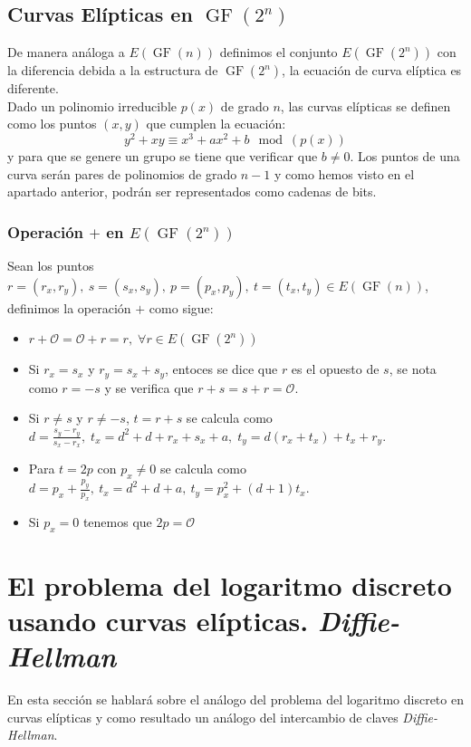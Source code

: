 \begin{aligned*}
\subsection{Curvas Elípticas en $\operatorname{GF}(2^n)$}

De manera análoga a $E(\operatorname{GF}(n))$ definimos el conjunto $E(\operatorname{GF}(2^n))$ con la diferencia debida a la estructura de $\operatorname{GF}(2^n)$, la ecuación de curva elíptica es diferente.\\
Dado un polinomio irreducible $p(x)$ de grado $n$, las curvas elípticas se definen como los puntos $(x,y)$ que cumplen la ecuación:
$$
	y^2+xy \equiv x^3+ax^2+b \mod (p(x))
$$
y para que se genere un grupo se tiene que verificar que $b\neq 0$.
Los puntos de una curva serán pares de polinomios de grado $n-1$ y como hemos visto en el apartado anterior, podrán ser representados como cadenas de bits.\\

\subsubsection{Operación $+$ en $E(\operatorname{GF}(2^n))$}
Sean los puntos $r=(r_x,r_y),\: s=(s_x,s_y),\: p=(p_x,p_y),\: t=(t_x,t_y)\in E(\operatorname{GF}(n))$, definimos la operación $+$  como sigue:
\begin{itemize}
	\item $r+\mathcal{O}=\mathcal{O}+r=r,\; \forall r \in E(\operatorname{GF}(2^n))$
	\item Si $r_x=s_x$ y $r_y=s_x+s_y$, entoces se dice que $r$ es el opuesto de $s$, se nota como $r=-s$ y se verifica que $r+s=s+r=\mathcal{O}$.
	\item Si $r\neq s$ y $r\neq-s$, $t=r+s$ se calcula como $d=\frac{s_y-r_y}{s_x-r_x},\; t_x=d^2+d+r_x+s_x+a,\; t_y=d(r_x+t_x)+t_x+r_y$.
	\item Para $t=2p$ con $p_x\neq 0$ se calcula como $d=p_x+\frac{p_y}{p_x}, \: t_x=d^2+d+a, \: t_y=p_x^2+(d+1)t_x$.
	\item Si $p_x=0$ tenemos que $2p=\mathcal{O}$
\end{itemize}

\section{El problema del logaritmo discreto usando curvas elípticas. \emph{Diffie-Hellman}}
En esta sección se hablará sobre el análogo del problema del logaritmo discreto en curvas elípticas y como resultado un análogo del intercambio de claves \emph{Diffie-Hellman}.


\end{aligned*}
